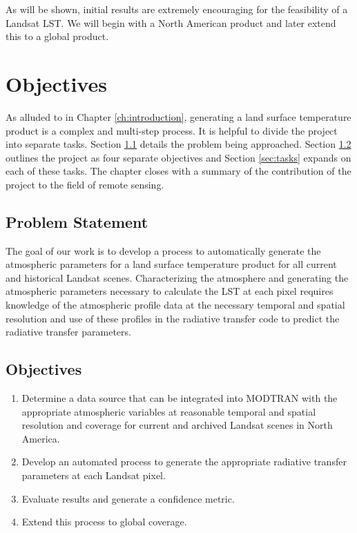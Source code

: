 \documentclass{book}
\begin{document}
As will be shown, initial results are extremely encouraging for the feasibility of a Landsat LST.  We will begin with a North American product and later extend this to a global product.

\chapter{Objectives}
\label{ch:objectives}

As alluded to in Chapter \ref{ch:introduction}, generating a land surface temperature product is a complex and multi-step process.  It is helpful to divide the project into separate tasks.  Section \ref{sec:problemstatement} details the problem being approached.  Section \ref{sec:objectives} outlines the project as four separate objectives and Section \ref{sec:tasks} expands on each of these tasks.  The chapter closes with a summary of the contribution of the project to the field of remote sensing.

\section{Problem Statement}
\label{sec:problemstatement}

The goal of our work is to develop a process to automatically generate the atmospheric parameters for a land surface temperature product for all current and historical Landsat scenes.  Characterizing the atmosphere and generating the atmospheric parameters necessary to calculate the LST at each pixel requires knowledge of the atmospheric profile data at the necessary temporal and spatial resolution and use of these profiles in the radiative transfer code to predict the radiative transfer parameters.

\section{Objectives}
\label{sec:objectives}

\begin{enumerate}

\item Determine a data source that can be integrated into MODTRAN with the appropriate atmospheric variables at reasonable temporal and spatial resolution and coverage for current and archived Landsat scenes in North America.

\item Develop an automated process to generate the appropriate radiative transfer parameters at each Landsat pixel.

\item Evaluate results and generate a confidence metric.

\item Extend this process to global coverage.

\end{enumerate}
\end{document}
